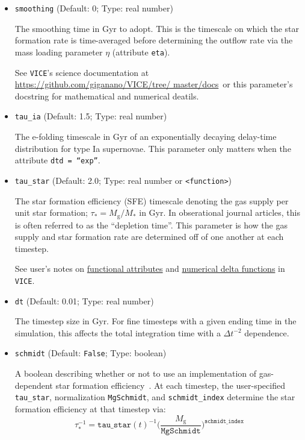 \documentclass{report}
\newcommand{\docsdir}{\url{https://github.com/giganano/VICE/tree/
master/docs}}
\begin{document}
\begin{itemize}
	\item{ %
		\texttt{smoothing} (Default: $0$; Type: real number) 
		\par 
		The smoothing time in Gyr to adopt. This is the timescale on which 
		the star formation rate is time-averaged before determining the 
		outflow rate via the mass loading parameter $\eta$ (attribute 
		\texttt{eta}). 
		\par
		See \texttt{VICE}'s science documentation at \docsdir~or this 
		parameter's docstring for mathematical and numerical deatils. 
	}

	\item{ %
		\texttt{tau\_ia} (Default: 1.5; Type: real number) 
		\par
		The e-folding timescale in Gyr of an exponentially decaying delay-time 
		distribution for type Ia supernovae. This parameter only matters when 
		the attribute \texttt{dtd = ``exp''}. 
	}

	\item{ %
		\texttt{tau\_star} (Default: 2.0; Type: real number or 
		\texttt{<function>}) 
		\par
		The star formation efficiency (SFE) timescale denoting the gas supply 
		per unit star formation; $\tau_* = M_\text{g}/\dot{M}_*$ in Gyr. In 
		obserational journal articles, this is often referred to as the 
		``depletion time''. This parameter is how the gas supply and star 
		formation rate are determined off of one another at each timestep. 
		\par
		See user's notes on \hyperlink{note:pyfuncs}{functional attributes} 
		and  \hyperlink{note:delta_funcs}{numerical delta functions} in 
		\texttt{VICE}. 
	}

	\item{ %
		\texttt{dt} (Default: 0.01; Type: real number) 
		\par
		The timestep size in Gyr. For fine timesteps with a given ending time 
		in the simulation, this affects the total integration time with a 
		$\Delta t^{-2}$ dependence. 
	}

	\item{ %
		\texttt{schmidt} (Default: \texttt{False}; Type: boolean) 
		\par 
		A boolean describing whether or not to use an implementation of 
		gas-dependent star formation efficiency~\citep[i.e. the 
		Kennicutt-Schmidt Law;][]{Schmidt1959,Leroy2008}. At each timestep, 
		the user-specified \texttt{tau\_star}, normalization \texttt{MgSchmidt}, 
		and \texttt{schmidt\_index} determine the star formation efficiency at 
		that timestep via: 
		\begin{equation}
		\tau_*^{-1} = \texttt{tau\_star}(t)^{-1} \Big(\frac{M_\text{g}}
		{\texttt{MgSchmidt}}\Big)^\texttt{schmidt\_index}
		\end{equation}
	}


\end{itemize}
\end{document}
